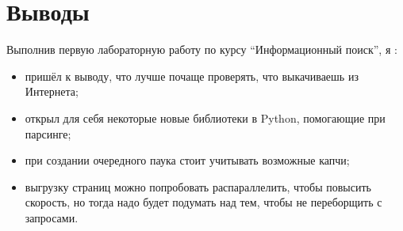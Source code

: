 \section{Выводы}

Выполнив первую лабораторную работу по курсу \enquote{Информационный поиск}, я :
\begin{itemize}
    \item пришёл к выводу, что лучше почаще проверять, что выкачиваешь из Интернета;
    \item открыл для себя некоторые новые библиотеки в Python, помогающие при парсинге;
    \item при создании очередного паука стоит учитывать возможные капчи;
    \item выгрузку страниц можно попробовать распараллелить, чтобы повысить скорость, но тогда надо будет подумать над тем, чтобы не переборщить с запросами.
\end{itemize}
\pagebreak
